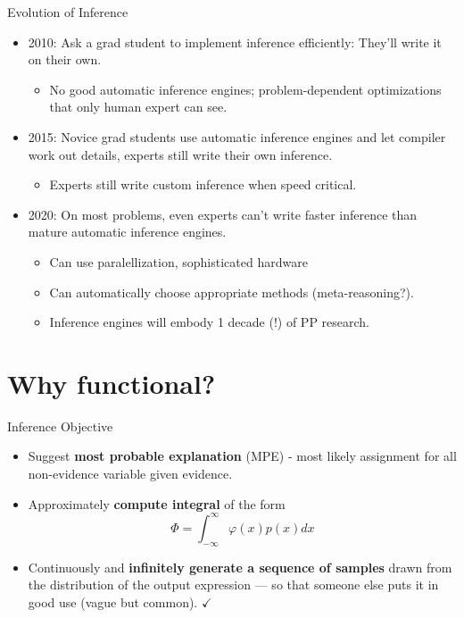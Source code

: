 \documentclass{beamer}
\begin{document}
\begin{frame}{Evolution of Inference}

    \begin{itemize}
\item           2010: Ask a grad student to implement inference efficiently: They'll write it on their own.
    \begin{itemize}
\item   No good automatic inference engines; problem-dependent optimizations that only human expert can see.
    \end{itemize}
    \pause
\item   2015: Novice grad students use automatic inference engines and let compiler work out details, experts still write their own inference.
    \begin{itemize}
\item   Experts still write custom inference when speed critical.
    \end{itemize}
    \pause
\item   2020: On most problems, even experts can't write faster inference than mature automatic inference engines.
    \begin{itemize}
\item   Can use paralellization, sophisticated hardware
\item   Can automatically choose appropriate methods (meta-reasoning?).
\item   Inference engines will embody 1 decade (!) of PP research.
    \end{itemize}
    \end{itemize}
\end{frame}

\section{Why functional?}

\begin{frame}{Inference Objective}
\begin{itemize}
\item Suggest \textbf{most probable explanation} (MPE) - most likely assignment
  for all non-evidence variable given evidence.
  \pause
\item Approximately \textbf{compute integral} of the
  form $$\Phi=\int_{-\infty}^{\infty} \varphi(x)p(x) dx$$
  \pause
\item Continuously and \textbf{infinitely generate a sequence of samples} drawn
  from the distribution of the output expression --- so that someone
  else puts it in good use (vague but common). $\checkmark$
\end{itemize}
\end{frame}
\end{document}
